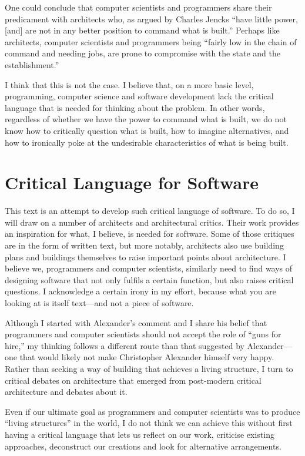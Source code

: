One could conclude that computer scientists and programmers share their predicament with architects
who, as argued by Charles Jencks ``have little power, [and] are not in any better
position to command what is built.'' Perhaps like architects, computer scientists and programmers
being ``fairly low in the chain of command and needing jobs, are prone to compromise with the
state and the establishment.''

I think that this is not the case. I believe that, on a more basic level, programming,
computer science and software development lack the critical language that is needed for thinking
about the problem. In other words, regardless of whether we have the power to command what is built,
we do not know how to critically question what is built, how to imagine alternatives, and how to
ironically poke at the undesirable characteristics of what is being built.

\section{Critical Language for Software}
This text is an attempt to develop such critical language of software. To do so, I will draw on
a number of architects and architectural critics. Their work provides an inspiration for
what, I believe, is needed for software. Some of those critiques are in the form of written text,
but more notably, architects also use building plans and buildings themselves to raise important
points about architecture. I believe we, programmers and computer scientists, similarly need to
find ways of designing software that not only fulfils a certain function, but also raises critical
questions. I acknowledge a certain irony in my effort, because what you are looking at is itself
text---and not a piece of software.

Although I started with Alexander's comment and I share his belief that programmers and computer
scientists should not accept the role of ``guns for hire,'' my thinking follows a different
route than that suggested by Alexander---one that would likely not make Christopher Alexander
himself very happy.
Rather than seeking a way of building that achieves a living structure, I turn to critical
debates on architecture that emerged from post-modern critical architecture and debates about it.

Even if our ultimate goal as programmers and computer scientists was to produce ``living
structures'' in the world, I do not think we can achieve this without first having a critical
language that lets us reflect on our work, criticise existing approaches, deconstruct our creations
and look for alternative arrangements.

